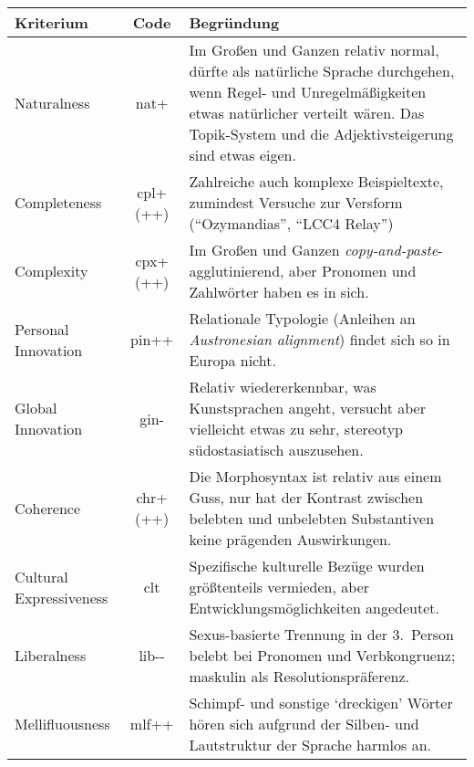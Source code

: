 \documentclass[12pt,paper=a4]{scrartcl}
\newcommand{\fw}[1]{\textit{#1}} %
\newcommand{\q}[1]{\enquote{#1}} %
\newcommand{\qq}[1]{\enquote*{#1}} %
\begin{document}
{\singlespacing
\begin{longtabu} to \textwidth {X[7] S[3] X[12]}
\toprule
\rowfont{\normalfont\sffamily\bfseries}
Kriterium
	& Code
	& Begründung
\\* \toprule
\endhead

Naturalness
	& nat+
	& Im Großen und Ganzen relativ normal, dürfte als natürliche Sprache 
	  durchgehen, wenn Regel- und Unregelmäßigkeiten etwas natürlicher 
	  verteilt wären.\phantom{p} Das Topik-System und die 
	  Adjektiv\-steigerung sind etwas eigen.\phantom{p}
\\* \midrule

Completeness
	& cpl+(++)
	& Zahlreiche auch komplexe Beispieltexte, zumindest Versuche zur 
	  Versform (\q{Ozymandias}, \q{LCC4 Relay})
\\* \midrule

Complexity
	& cpx+(++)
	& Im Großen und Ganzen \fw{copy-and-paste}-ag\-glu\-tinierend, aber 
	  Pronomen und Zahlwörter haben es in sich.\phantom{p}
\\* \midrule

Personal Innovation
	& pin++
	& Relationale Typologie (Anleihen an \fw{Austronesian align\-ment}) 
	  findet sich so in Europa nicht.\phantom{p}
\\* \midrule

Global Innovation
	& gin-
	& Relativ wiedererkennbar, was Kunstsprachen angeht, versucht aber 
	  vielleicht etwas zu sehr, stereotyp südostasiatisch 
	  auszusehen.\phantom{p}
\\* \midrule

Coherence
	& chr+(++)
	& Die Morphosyntax ist relativ aus einem Guss, nur hat der Kontrast 
	  zwischen belebten und unbelebten Substantiven keine prägenden 
	  Aus\-wirkungen.\phantom{p}
\\* \midrule

Cultural Expressiveness
	& clt
	& Spezifische kulturelle Bezüge wurden größtenteils vermieden, aber 
	  Entwicklungsmöglichkeiten angedeutet.\phantom{p}
\\* \midrule

Liberalness
	& lib-{}-
	& Sexus-basierte Trennung in der 3.~Person belebt bei Pronomen und 
	Verbkongruenz; maskulin als Resolutionspräferenz.\phantom{p}
\\* \midrule

Mellifluousness
	& mlf++
	& Schimpf- und sonstige \qq{dreckigen} Wörter hören sich aufgrund der 
	  Silben- und Lautstruktur der Sprache harmlos an.\phantom{p}
\\* \midrule


\end{longtabu}}
\end{document}
